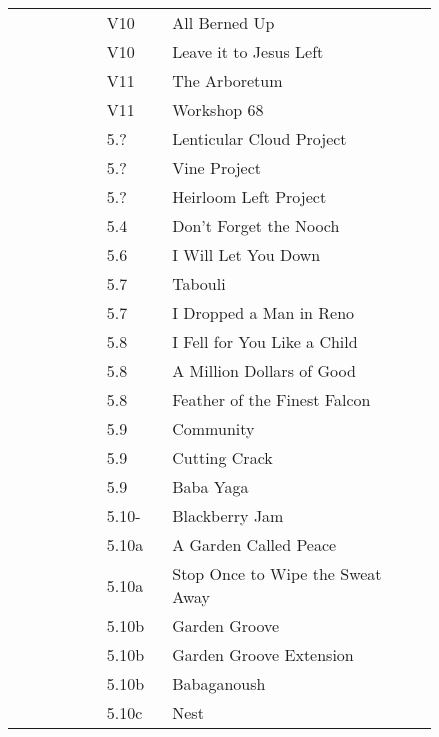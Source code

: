 \begin{flushleft}
\begin{center}
\begin{supertabular}{p{0.18\linewidth}p{0.13\linewidth}p{0.45\linewidth}p{0.08\linewidth}}
 &V10&All Berned Up & \pageref{rt:All Berned Up} \\
 &V10&Leave it to Jesus Left & \pageref{vr:Leave it to Jesus Left} \\
 &V11&The Arboretum & \pageref{rt:The Arboretum} \\
 &V11&Workshop 68 & \pageref{vr:Workshop 68} \\
&5.?&Lenticular Cloud Project & \pageref{rt:Lenticular Cloud Project} \\
&5.?&Vine Project & \pageref{rt:Vine Project} \\
&5.?&Heirloom Left Project & \pageref{vr:Heirloom Left Project} \\
&5.4&Don't Forget the Nooch & \pageref{rt:Don't Forget the Nooch} \\
&5.6&I Will Let You Down & \pageref{rt:I Will Let You Down} \\
&5.7&Tabouli & \pageref{rt:Tabouli} \\
&5.7&I Dropped a Man in Reno & \pageref{rt:I Dropped a Man in Reno} \\
&5.8&I Fell for You Like a Child & \pageref{rt:I Fell for You Like a Child} \\
&5.8&A Million Dollars of Good & \pageref{rt:A Million Dollars of Good} \\
&5.8&Feather of the Finest Falcon & \pageref{rt:Feather of the Finest Falcon} \\
&5.9&Community & \pageref{rt:Community} \\
&5.9&Cutting Crack & \pageref{rt:Cutting Crack} \\
&5.9&Baba Yaga & \pageref{rt:Baba Yaga} \\
&5.10-&Blackberry Jam & \pageref{rt:Blackberry Jam} \\
&5.10a&A Garden Called Peace & \pageref{rt:A Garden Called Peace} \\
&5.10a&Stop Once to Wipe the Sweat Away & \pageref{rt:Stop Once to Wipe the Sweat Away} \\
&5.10b&Garden Groove & \pageref{rt:Garden Groove} \\
&5.10b&Garden Groove Extension & \pageref{vr:Garden Groove Extension} \\
&5.10b&Babaganoush & \pageref{rt:Babaganoush} \\
&5.10c&Nest & \pageref{rt:Nest} \\

\end{supertabular}
\end{center}
\end{flushleft}
